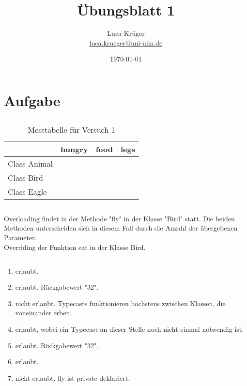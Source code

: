 \documentclass[a4paper]{article}
\title{Übungsblatt 1}
\author{Luca Krüger \\ \href{mailto:luca.krueger@uni-ulm.de}{luca.krueger@uni-ulm.de}}
\date{\today}
\begin{document}
\maketitle
\section*{Aufgabe \thesection}
	
	\subsection{}
	
	\begin{table}[!h]
		\centering
		\begin{tabular}{l c c c}
			&hungry&food&legs \\ \hline
			Class Animal&\checkmark&\checkmark& \\
			Class Bird&&\checkmark&\checkmark \\
			Class Eagle&&\checkmark&\checkmark \\
		\end{tabular}
		\caption{Messtabelle für Versuch 1}
		\label{tab:messtab1}
	\end{table}

	\subsection{}
	
	Overloading findet in der Methode "fly" in der Klasse "Bird" statt. Die beiden Methoden unterscheiden sich in diesem Fall durch die Anzahl der übergebenen Parameter.\\
	Overriding der Funktion eat in der Klasse Bird.
	
	\subsection{}
	
	\begin{enumerate}
		\item erlaubt.
		\item erlaubt. Rückgabewert "32".
		\item nicht erlaubt. Typecasts funktionieren höchstens zwischen Klassen, die voneinander erben.
		\item erlaubt, wobei ein Typecast an dieser Stelle noch nicht einmal notwendig ist.
		\item erlaubt. Rückgabewert "32".
		\item erlaubt.
		\item nicht erlaubt. fly ist private deklariert.
		
	\end{enumerate}
	
	
\end{document}
